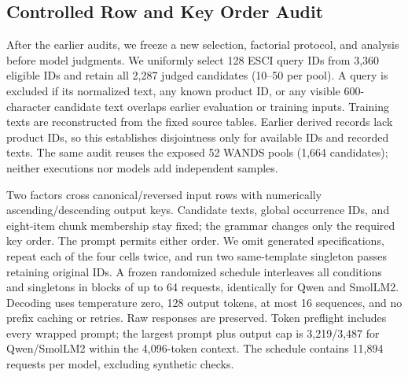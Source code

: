 \documentclass[conference]{IEEEtran}
\begin{document}
\subsection{Controlled Row and Key Order Audit}
After the earlier audits, we freeze a new selection, factorial protocol, and analysis before model judgments. We uniformly select 128 ESCI query IDs from 3,360 eligible IDs and retain all 2,287 judged candidates (10--50 per pool). A query is excluded if its normalized text, any known product ID, or any visible 600-character candidate text overlaps earlier evaluation or training inputs. Training texts are reconstructed from the fixed source tables. Earlier derived records lack product IDs, so this establishes disjointness only for available IDs and recorded texts. The same audit reuses the exposed 52 WANDS pools (1,664 candidates); neither executions nor models add independent samples.

Two factors cross canonical/reversed input rows with numerically ascending/descending output keys. Candidate texts, global occurrence IDs, and eight-item chunk membership stay fixed; the grammar changes only the required key order. The prompt permits either order. We omit generated specifications, repeat each of the four cells twice, and run two same-template singleton passes retaining original IDs. A frozen randomized schedule interleaves all conditions and singletons in blocks of up to 64 requests, identically for Qwen and SmolLM2. Decoding uses temperature zero, 128 output tokens, at most 16 sequences, and no prefix caching or retries. Raw responses are preserved. Token preflight includes every wrapped prompt; the largest prompt plus output cap is 3,219/3,487 for Qwen/SmolLM2 within the 4,096-token context. The schedule contains 11,894 requests per model, excluding synthetic checks.
\end{document}
